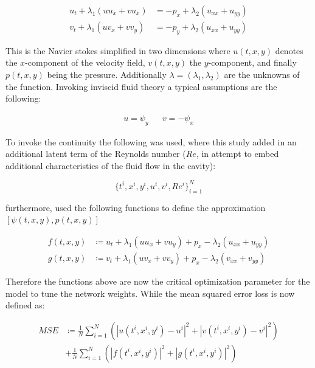 \documentclass{article}
\begin{document}
    \begin{equation}
    	\begin{aligned}
	    	u_{t} + \lambda_{1} (u u_{x} + v u_{x}) & = - p_{x} + \lambda_{2}(u_{xx} + u_{yy}) \\
			v_{t} + \lambda_{1} (u v_{x} + v v_{y}) & = - p_{y} + \lambda_{2}(u_{xx} + u_{yy}) 
    	\end{aligned}
    \end{equation}

	 \noindent This is the Navier stokes simplified in two dimensions where $ u(t,x,y) $ denotes the $x$-component of the velocity field, $ v(t,x,y) $ the $y$-component, and finally $ p(t,x,y) $ being the pressure. Additionally $\lambda = (\lambda_{1}, \lambda_{2})$ are the unknowns of the function. Invoking inviscid fluid theory a typical assumptions are the following:
	

    \begin{align}
    	u = \psi_{y} && v = -\psi_{x}
    \end{align}
    
     \noindent To invoke the continuity  the following was used, where this study added in an additional latent term of the Reynolds number ($Re$, in attempt to embed additional characteristics of the fluid flow in the cavity):
    
    \begin{equation}
    	\{t^i, x^i, y^i, u^i, v^i, Re^i\}^{N}_{i=1}
    \end{equation}

	 \noindent furthermore, \citeauthor{DBLP:journals/corr/abs-1711-10566} used the following functions to define the approximation $\left[ \psi(t,x,y), p(t,x,y)\right]$
	
	\begin{equation}
		\begin{aligned}
			f(t,x,y) & \coloneqq u_t + \lambda_1 ( u u_x + v u_y) + p_x - \lambda_{2}(u_{xx} + u_{yy}) \\ 
			g(t,x,y) & \coloneqq v_t + \lambda_1 ( u v_x + v v_y) + p_x - \lambda_{2}(v_{xx} + v_{yy})
		\end{aligned}
	\end{equation}

	 \noindent Therefore the functions above are now the critical optimization parameter for the model to tune the network weights. While the mean squared error loss is now defined as:
	
	\begin{align}
		MSE & \coloneqq \frac{1}{N} \sum_{i=1}^{N} ( |u(t^i,x^i,y^i) - u^i |^2 + | v(t^i,x^i,y^i) - v^i |^2)\\
		 & + \frac{1}{N} \sum_{i=1}^{N} ( |f(t^i,x^i,y^i)|^2 + | g(t^i,x^i,y^i)|^2)
	\end{align}
    
\end{document}
